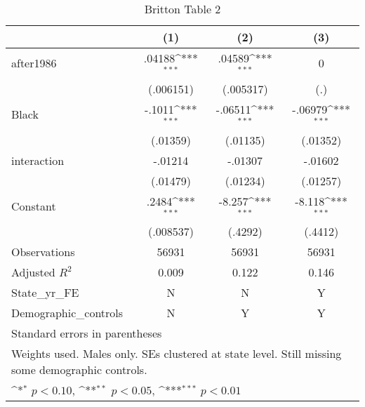 \begin{table}[htbp]\centering
\def\sym#1{\ifmmode^{#1}\else\(^{#1}\)\fi}
\caption{Britton Table 2}
\begin{tabular}{l*{3}{c}}
\hline\hline
                    &\multicolumn{1}{c}{(1)}         &\multicolumn{1}{c}{(2)}         &\multicolumn{1}{c}{(3)}         \\
\hline
after1986           &      .04188\sym{***}&      .04589\sym{***}&           0         \\
                    &   (.006151)         &   (.005317)         &         (.)         \\
[1em]
Black               &      -.1011\sym{***}&     -.06511\sym{***}&     -.06979\sym{***}\\
                    &    (.01359)         &    (.01135)         &    (.01352)         \\
[1em]
interaction         &     -.01214         &     -.01307         &     -.01602         \\
                    &    (.01479)         &    (.01234)         &    (.01257)         \\
[1em]
Constant            &       .2484\sym{***}&      -8.257\sym{***}&      -8.118\sym{***}\\
                    &   (.008537)         &     (.4292)         &     (.4412)         \\
\hline
Observations        &       56931         &       56931         &       56931         \\
Adjusted \(R^{2}\)  &       0.009         &       0.122         &       0.146         \\
State\_yr\_FE         &           N         &           N         &           Y         \\
Demographic\_controls&           N         &           Y         &           Y         \\
\hline\hline
\multicolumn{4}{l}{\footnotesize Standard errors in parentheses}\\
\multicolumn{4}{l}{\footnotesize Weights used. Males only. SEs clustered at state level. Still missing some demographic controls.}\\
\multicolumn{4}{l}{\footnotesize \sym{*} \(p<0.10\), \sym{**} \(p<0.05\), \sym{***} \(p<0.01\)}\\
\end{tabular}
\end{table}
